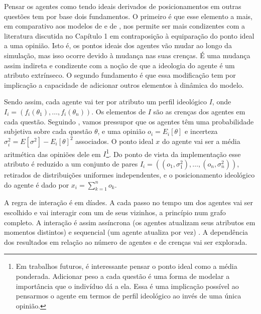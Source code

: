 Pensar os agentes como tendo ideais derivados de posicionamentos em outras
questões tem por base dois fundamentos. O primeiro é que esse elemento a mais, em
comparativo aos modelos de  e de
, nos permite ser mais condizentes com a
literatura discutida no Capítulo 1 em contraposição à equiparação do ponto ideal
a uma opinião. Isto é, os pontos ideais dos agentes vão mudar ao longo da
simulação, mas isso ocorre devido à mudança nas suas crenças. É uma
mudança assim indireta e condizente com a noção de que a ideologia do agente é
um atributo extrínseco. O segundo fundamento é que essa modificação tem por
implicação a capacidade de adicionar outros elementos à dinâmica do modelo.


Sendo assim, cada agente vai ter por atributo um perfil ideológico \(I\), onde
\(I_i = (f_i(\theta_1), \ldots, f_i(\theta_n)) \). Os elementos de \(I\) são as crenças dos
agentes em cada questão. Seguindo , vamos pressupor
que os agentes têm uma probabilidade subjetiva sobre cada questão \(\theta\), e uma
opinião \( o_i = E_i[\theta]\) e incerteza \( \sigma_i^2 = E[\sigma^2] - E_ i[\theta]^2\)
associados. O ponto ideal \(x\) do agente vai ser a média aritmética das opiniões dele em
\(I\)\footnote{Em trabalhos futuros, é interessante pensar o ponto ideal como a
  média ponderada. Adicionar peso a cada questão é uma forma de modelar a
 importância que o indivíduo dá a ela. Essa é uma implicação possível ao
 pensarmos o agente em termos de perfil ideológico ao invés de uma única
 opinião.}. Do ponto de vista da implementação esse atributo é reduzido a um
conjunto de pares \(I_i = ((o_1,\sigma_1^2), \ldots, (o_n, \sigma_n^2) )\), retirados de
distribuições uniformes independentes, e o posicionamento ideológico do agente é
dado por \(x_i = \sum_{k=1}^{n} o_k\).

A regra de interação é em díades. A cada passo no tempo um dos agentes vai ser
escolhido e vai interagir com um de seus vizinhos, a princípio num grafo
completo. A interação é assim assíncrona (os agentes atualizam seus atributos em
momentos distintos) e sequencial (um agente atualiza por vez)
\cite{wilensky2015introduction}. A dependência dos resultados em relação ao
número de agentes e de crenças vai ser explorada.

